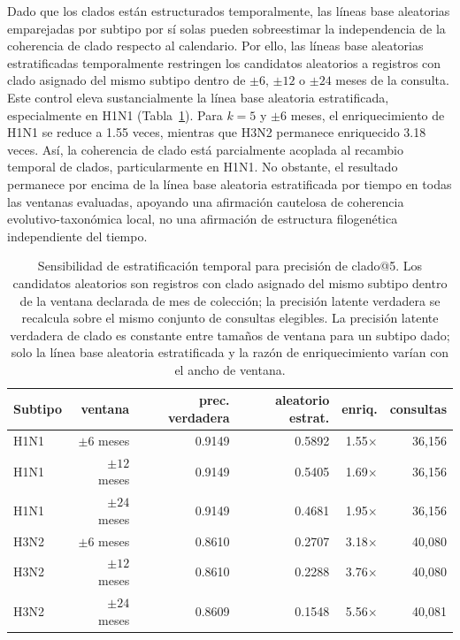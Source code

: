 \documentclass[11pt]{article}
\begin{document}
Dado que los clados están estructurados temporalmente, las líneas base aleatorias emparejadas por subtipo por sí solas pueden sobreestimar la independencia de la coherencia de clado respecto al calendario. Por ello, las líneas base aleatorias estratificadas temporalmente restringen los candidatos aleatorios a registros con clado asignado del mismo subtipo dentro de $\pm 6$, $\pm 12$ o $\pm 24$ meses de la consulta. Este control eleva sustancialmente la línea base aleatoria estratificada, especialmente en H1N1 (Tabla~\ref{tab:clade-temporal-stratified}). Para $k=5$ y $\pm 6$ meses, el enriquecimiento de H1N1 se reduce a 1.55 veces, mientras que H3N2 permanece enriquecido 3.18 veces. Así, la coherencia de clado está parcialmente acoplada al recambio temporal de clados, particularmente en H1N1. No obstante, el resultado permanece por encima de la línea base aleatoria estratificada por tiempo en todas las ventanas evaluadas, apoyando una afirmación cautelosa de coherencia evolutivo-taxonómica local, no una afirmación de estructura filogenética independiente del tiempo.

\begin{table}[H]
\centering
\caption{Sensibilidad de estratificación temporal para precisión de clado@5. Los candidatos aleatorios son registros con clado asignado del mismo subtipo dentro de la ventana declarada de mes de colección; la precisión latente verdadera se recalcula sobre el mismo conjunto de consultas elegibles. La precisión latente verdadera de clado es constante entre tamaños de ventana para un subtipo dado; solo la línea base aleatoria estratificada y la razón de enriquecimiento varían con el ancho de ventana.}
\label{tab:clade-temporal-stratified}
\small
\begin{tabular}{lrrrrr}
\toprule
Subtipo & ventana & prec. verdadera & aleatorio estrat. & enriq. & consultas \\
\midrule
H1N1 & $\pm 6$ meses & 0.9149 & 0.5892 & 1.55$\times$ & 36,156 \\
H1N1 & $\pm 12$ meses & 0.9149 & 0.5405 & 1.69$\times$ & 36,156 \\
H1N1 & $\pm 24$ meses & 0.9149 & 0.4681 & 1.95$\times$ & 36,156 \\
H3N2 & $\pm 6$ meses & 0.8610 & 0.2707 & 3.18$\times$ & 40,080 \\
H3N2 & $\pm 12$ meses & 0.8610 & 0.2288 & 3.76$\times$ & 40,080 \\
H3N2 & $\pm 24$ meses & 0.8609 & 0.1548 & 5.56$\times$ & 40,081 \\
\bottomrule
\end{tabular}
\normalsize
\end{table}
\end{document}
